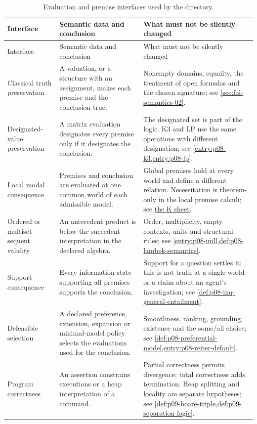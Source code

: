 \begin{longtable}{@{}p{}p{}p{}@{}}
\caption{Evaluation and premise interfaces used by the directory.}
\label{tab:p14-directory-consequence}\\
\toprule
Interface & Semantic data and conclusion & What must not be silently changed\\
\midrule
\endfirsthead
\toprule
Interface & Semantic data and conclusion & What must not be silently changed\\
\midrule
\endhead
\bottomrule
\endfoot
Classical truth preservation & A valuation, or a structure with an
assignment, makes each premise and the conclusion true. & Nonempty domains,
equality, the treatment of open formulas and the chosen signature; see
\cref{sec:fol-semantics-02}.\\\addlinespace
Designated-value preservation & A matrix evaluation designates every
premise only if it designates the conclusion. & The designated set is part
of the logic. K3 and LP use the same operations with different designation;
see \cref{entry:p08-k3,entry:p08-lp}.\\\addlinespace
Local modal consequence & Premises and conclusion are evaluated at one
common world of each admissible model. & Global premises hold at every
world and define a different relation. Necessitation is theorem-only in
the local premise calculi; see \hyperref[sheet:hilbert-k]{the K sheet}.\\\addlinespace
Ordered or multiset sequent validity & An antecedent product is below the
succedent interpretation in the declared algebra. & Order, multiplicity,
empty contexts, units and structural rules; see
\cref{entry:p08-imll,def:p08-lambek-semantics}.\\\addlinespace
Support consequence & Every information state supporting all premises
supports the conclusion. & Support for a question settles it; this is not
truth at a single world or a claim about an agent's investigation;
see \cref{def:p08-inq-general-entailment}.\\\addlinespace
Defeasible selection & A declared preference, extension, expansion or
minimal-model policy selects the evaluations used for the conclusion. &
Smoothness, ranking, grounding, existence and the some/all choice;
see \cref{def:p08-preferential-model,entry:p08-reiter-default}.\\\addlinespace
Program correctness & An assertion constrains executions or a heap
interpretation of a command. & Partial correctness permits divergence;
total correctness adds termination. Heap splitting and locality are
separate hypotheses; see \cref{def:p09-hoare-triple,def:p09-separation-logic}.\\
\end{longtable}

